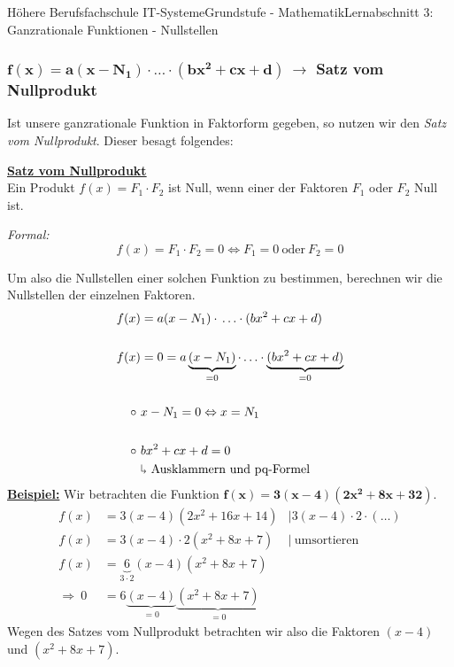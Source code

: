 \documentclass[11pt,twocolumn,oneside,openany,headings=optiontotoc,11pt,numbers=noenddot]{article}
\begin{document}
\begin{worksheet}{Höhere Berufsfachschule IT-Systeme}{Grundstufe - Mathematik}{Lernabschnitt 3: Ganzrationale Funktionen - Nullstellen}
		\subsubsection{\(\mathbf{f(x) = a(x-N_1)\cdot{}\ldots\cdot{}(bx^2 + cx + d)}\ \rightarrow\) Satz vom Nullprodukt}
		Ist unsere ganzrationale Funktion in Faktorform gegeben, so nutzen wir den \textit{Satz vom Nullprodukt}. Dieser besagt folgendes:
		\begin{framed}
			\noindent
			\textbf{\underline{Satz vom Nullprodukt}}\\
			Ein Produkt \(f(x) = F_1\cdot{}F_2\) ist Null, wenn einer der Faktoren \(F_1\) oder \(F_2\) Null ist.\\
			\par\noindent
			\textit{Formal:} \[f(x) = F_1\cdot{}F_2 = 0 \Leftrightarrow F_1 = 0\ \text{oder}\ F_2 = 0\]
		\end{framed}
		Um also die Nullstellen einer solchen Funktion zu bestimmen, berechnen wir die Nullstellen der einzelnen Faktoren.
		\begin{align*}
			f(x) & = a(x-N_1)\cdot{}\ldots\cdot{}(bx^2 + cx + d)\\
			\\
			f(x) & = 0 = a\underbrace{(x-N_1)}_{=0}\cdot\ldots\cdot\underbrace{(bx^2+cx+d)}_{=0}\\
			\\
			\circ\ & x-N_1 = 0 \Leftrightarrow x = N_1\\
			\\
			\circ\ & bx^2 + cx + d = 0\\
			& 	\rotatebox[origin=c]{180}{$\Lsh$} \text{\ Ausklammern\ und\ pq-Formel}
		\end{align*}
		\textbf{\underline{Beispiel:}} Wir betrachten die Funktion \(\mathbf{f(x) = 3(x-4)(2x^2 + 8x + 32)}\).\\
		\begin{align*}
			f(x) & = 3(x-4)(2x^2 + 16x + 14) & |3(x-4)\cdot{}2\cdot(\ldots)\\
			f(x) & = 3(x-4)\cdot{}2(x^2 + 8x + 7) & |\ \text{umsortieren}\\
			f(x) & = \underbrace{6}_{3\cdot{}2}(x-4)(x^2+8x+7)\\
			\Rightarrow\ 0 & = 6\underbrace{(x-4)}_{=0}\underbrace{(x^2+8x+7)}_{=0}
		\end{align*}
		Wegen des Satzes vom Nullprodukt betrachten wir also die Faktoren \((x-4)\) und \((x^2+8x+7)\).\\
		\par\noindent
		\begin{tabularx}{0.48\textwidth}{Xl}

\end{tabularx}
\end{worksheet}
\end{document}
